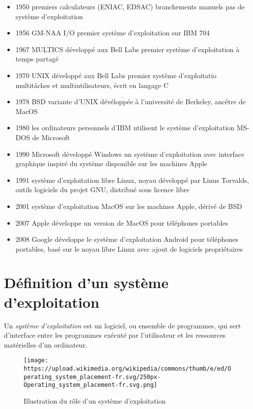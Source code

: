 \documentclass[
  11pt,
]{article}
\newcounter{prop}
\newcounter{prog}
\newcounter{logi}
\begin{document}
\begin{itemize}
\item
  1950 premiers calculateurs (ENIAC, EDSAC) branchements manuels pas de
  système d'exploitation
\item
  1956 GM-NAA I/O premier système d'exploitation sur IBM 704
\item
  1967 MULTICS développé aux Bell Labs premier système d'exploitation à
  temps partagé
\item
  1970 UNIX développé aux Bell Labs premier système d'exploitatio
  multitâches et multiutilisateurs, écrit en langage C
\item
  1978 BSD variante d'UNIX dévéloppée à l'université de Berkeley,
  ancêtre de MacOS
\item
  1980 les ordinateurs personnels d'IBM utilisent le système
  d'exploitation MS-DOS de Microsoft
\item
  1990 Microsoft développé Windows un système d'exploitation avec
  interface graphique inspiré du système disponible sur les machines
  Apple
\item
  1991 système d'exploitation libre Linux, noyau développé par Linus
  Torvalds, outils logiciels du projet GNU, distribué sous licence libre
\item
  2001 système d'exploitation MacOS sur les machines Apple, dérivé de
  BSD
\item
  2007 Apple développe un version de MacOS pour téléphones portables
\item
  2008 Google développe le système d'exploitation Android pour
  téléphones portables, basé sur le noyau libre Linux avec ajout de
  logiciels propriétaires
\end{itemize}

\hypertarget{duxe9finition-dun-systuxe8me-dexploitation}{%
\section{Définition d'un système
d'exploitation}\label{duxe9finition-dun-systuxe8me-dexploitation}}

Un \emph{système d'exploitation} est un logiciel, ou ensemble de
programmes, qui sert d'interface entre les programmes exécuté par
l'utilisateur et les ressources matérielles d'un ordinateur.

\begin{figure}
\centering
\texttt{[image: https://upload.wikimedia.org/wikipedia/commons/thumb/e/ed/Operating\_system\_placement-fr.svg/250px-Operating\_system\_placement-fr.svg.png]}
\caption{Illustration du rôle d'un système d'exploitation}
\end{figure}
\end{document}

